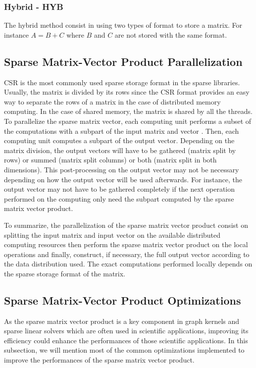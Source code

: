 \subsubsection{Hybrid - HYB}

The hybrid method consist in using two types of format to store a matrix.
For instance $A = B + C$ where $B$ and $C$ are not stored with the same format.


\subsection{Sparse Matrix-Vector Product Parallelization}
CSR is the most commonly used sparse storage format in the sparse libraries.
Usually, the matrix is divided by its rows \cite{YeCP2015} since the CSR format provides an easy way to separate the rows of a matrix in the case of distributed memory computing.
In the case of shared memory, the matrix is shared by all the threads.
To parallelize the sparse matrix vector, each computing unit performs a subset of the computations with a subpart of the input matrix and vector \cite{PageK2018}.
Then, each computing unit computes a subpart of the output vector.
Depending on the matrix division, the output vectors will have to be gathered (matrix split by rows) or summed (matrix split columns) or both (matrix split in both dimensions).
This post-processing on the output vector may not be necessary depending on how the output vector will be used afterwards.
For instance, the output vector may not have to be gathered completely if the next operation performed on the computing only need the subpart computed by the sparse matrix vector product.


To summarize, the parallelization of the sparse matrix vector product consist on splitting the input matrix and input vector on the available distributed computing resources then perform the sparse matrix vector product on the local operations and finally, construct, if necessary, the full output vector according to the data distribution used.
The exact computations performed locally \cite{FeWPS1993} depends on the sparse storage format of the matrix.


\subsection{Sparse Matrix-Vector Product Optimizations}
As the sparse matrix vector product is a key component in graph kernels and sparse linear solvers which are often used in scientific applications, improving its efficiency could enhance the performances of those scientific applications.
In this subsection, we will mention most of the common optimizations implemented to improve the performances of the sparse matrix vector product.


